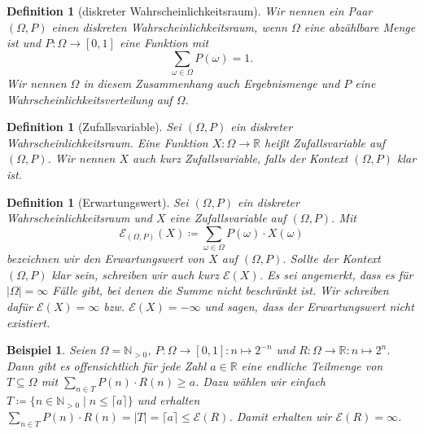 \documentclass[a4paper]{article}
\newtheorem{beispiel}[satz]{Beispiel}
\newtheorem{definition}[satz]{Definition} %
\theoremstyle{nonumberplain}
\begin{document}
	\newcommand{\probspace}{diskreter Wahr\-schein\-lich\-keits\-raum}
	\newcommand{\probspacen}{diskreten Wahr\-schein\-lich\-keits\-raum}
	\newcommand{\probspaceexraw}{(\Omega, P)}
	\newcommand{\probspaceex}{$(\Omega, P)$}
	\begin{definition}[\probspace{}] \label{def-probspace}
		\hspace{-0.5em} Wir nennen ein Paar \probspaceex{} einen \probspacen{}, wenn $\Omega$ eine abzählbare Menge ist und $P : \Omega \to [0,1] $ eine Funktion mit
		\begin{equation}
		\sum_{\omega \in \Omega} P(\omega) = 1 \text{.}
		\end{equation} Wir nennen $\Omega$ in diesem Zusammenhang auch Ergebnismenge und $P$ eine Wahr\-schein\-lich\-keitsverteilung auf $\Omega$.
	\end{definition}
	\newcommand{\rvar}{Zufallsvariable}
	\begin{definition}[\rvar{}] \label{def-rvar}
		Sei \probspaceex{} ein \probspace{}. Eine Funktion $X : \Omega \to \mathbb{R}$ heißt \rvar{} auf \probspaceex{}. Wir nennen $X$ auch kurz \rvar{}, falls der Kontext \probspaceex{} klar ist.
	\end{definition}
	\newcommand{\expect}{Erwartungswert}
	\newcommand{\mexp}{\mathcal{E}}
	\begin{definition}[\expect{}] \label{def-expect}
		\hspace{1ex} Sei \probspaceex{} ein \probspace{} und $X$ eine \rvar{} auf \probspaceex{}. Mit
		\begin{equation}
		\mathcal{E}_{\probspaceexraw{}}(X) \coloneqq \sum_{\omega \in \Omega}{P(\omega) \cdot X(\omega)}
		\end{equation}
		bezeichnen wir den \expect{} von $X$ auf \probspaceex{}. Sollte der Kontext \probspaceex{} klar sein, schreiben wir auch kurz $\mathcal{E}(X)$. Es sei angemerkt, dass es für $|\Omega|=\infty$ Fälle gibt, bei denen die Summe nicht beschränkt ist. Wir schreiben dafür $\mathcal{E}(X) = \infty$ bzw. $\mathcal{E}(X) = -\infty$ und sagen, dass der Erwartungswert nicht existiert.
	\end{definition}
	\begin{beispiel}
		Seien $\Omega = \mathbb{N}_{>0}$, $P : \Omega \to [0,1] : n \mapsto 2^{-n}$ und $R : \Omega \to \mathbb{R} : n \mapsto 2^{n}$. Dann gibt es offensichtlich für jede Zahl $a \in \mathbb{R}$ eine endliche Teilmenge von $T \subseteq \Omega$ mit $\sum_{n \in T}{P(n) \cdot R(n)} \geq a$. Dazu wählen wir einfach $T \coloneqq \{n \in \mathbb{N}_{>0}\mid n \leq \lceil a \rceil \}$ und erhalten $\sum_{n \in T}{P(n) \cdot R(n)} = |T| = \lceil a \rceil \leq \mathcal{E}(R)$. Damit erhalten wir $\mathcal{E}(R) = \infty$.
	\end{beispiel}
\end{document}

